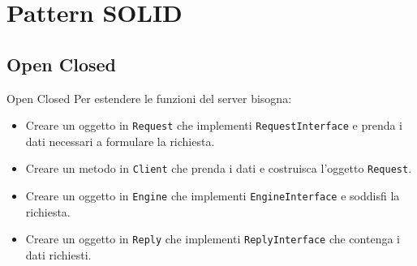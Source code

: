 \documentclass{beamer}
\begin{document}
\section{Pattern SOLID}


\subsection{Open Closed}
\begin{frame}{Open Closed}
Per estendere le funzioni del server bisogna:
\begin{itemize}
\item Creare un oggetto in \texttt{Request} che implementi \texttt{RequestInterface} e prenda i dati necessari a formulare la richiesta.
\item Creare un metodo in \texttt{Client} che prenda i dati e costruisca l'oggetto \texttt{Request}.
\item Creare un oggetto in \texttt{Engine} che implementi \texttt{EngineInterface} e soddisfi la richiesta.
\item Creare un oggetto in \texttt{Reply} che implementi \texttt{ReplyInterface} che contenga i dati richiesti.
\end{itemize}
\end{frame}


\end{document}
